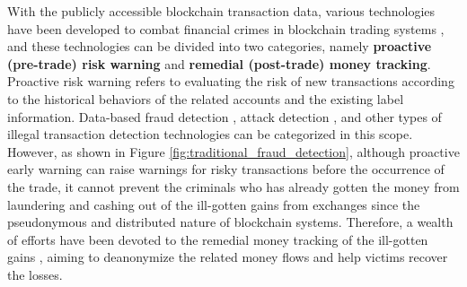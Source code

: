 With the publicly accessible blockchain transaction data, various technologies have been developed to combat financial crimes in blockchain trading systems \cite{wu2021analysis}, and these technologies can be divided into two categories, namely \textbf{proactive (pre-trade) risk warning} and \textbf{remedial (post-trade) money tracking}. Proactive risk warning refers to evaluating the risk of new transactions according to the historical behaviors of the related accounts and the existing label information. Data-based fraud detection \cite{WhoAreThePhisher}, attack detection \cite{wu2021defiranger}, and other types of illegal transaction detection technologies \cite{weber2019anti} can be categorized in this scope. However, as shown in Figure \ref{fig:traditional_fraud_detection}, although proactive early warning can raise warnings for risky transactions before the occurrence of the trade, it cannot prevent the criminals who has already gotten the money from laundering and cashing out of the ill-gotten gains from exchanges since the pseudonymous and distributed nature of blockchain systems. Therefore, a wealth of efforts have been devoted to the remedial money tracking of the ill-gotten gains \cite{yousaf2019tracing,wulei2021www,di2015bitconeview}, aiming to deanonymize the related money flows and help victims recover the losses. 

